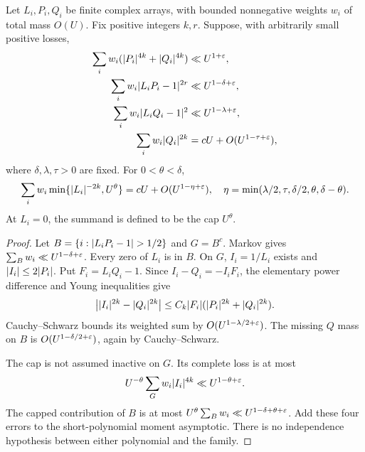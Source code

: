 \begin{theorem}\label{thm:two-mollifier}
Let $L_i,P_i,Q_i$ be finite complex arrays, with bounded nonnegative weights $w_i$ of total mass $O(U)$. Fix positive integers $k,r$. Suppose, with arbitrarily small positive losses,
\begin{align*}
 \sum_iw_i(\lvert P_i\rvert^{4k}+\lvert Q_i\rvert^{4k})&\ll U^{1+\varepsilon},\\
 \sum_iw_i\lvert L_iP_i-1\rvert^{2r}&\ll U^{1-\delta+\varepsilon},\\
 \sum_iw_i\lvert L_iQ_i-1\rvert^{2}&\ll U^{1-\lambda+\varepsilon},\\
 \sum_iw_i\lvert Q_i\rvert^{2k}&=cU+O(U^{1-\tau+\varepsilon}),
\end{align*}
where $\delta,\lambda,\tau>0$ are fixed. For $0<\theta<\delta$,
\begin{equation}\label{eq:two-mollifier}
 \sum_iw_i\min\{\lvert L_i\rvert^{-2k},U^\theta\}
 =cU+O(U^{1-\eta+\varepsilon}),\quad
 \eta=\min(\lambda/2,\tau,\delta/2,\theta,\delta-\theta).
\end{equation}
At $L_i=0$, the summand is defined to be the cap $U^\theta$.
\end{theorem}
\begin{proof}
Let $B=\{i:\lvert L_iP_i-1\rvert>1/2\}$ and $G=B^c$. Markov gives $\sum_Bw_i\ll U^{1-\delta+\varepsilon}$. Every zero of $L_i$ is in $B$. On $G$, $I_i=1/L_i$ exists and $\lvert I_i\rvert\le2\lvert P_i\rvert$. Put $F_i=L_iQ_i-1$. Since $I_i-Q_i=-I_iF_i$, the elementary power difference and Young inequalities give
\[
 \bigl|\lvert I_i\rvert^{2k}-\lvert Q_i\rvert^{2k}\bigr|
 \le C_k\lvert F_i\rvert(\lvert P_i\rvert^{2k}+\lvert Q_i\rvert^{2k}).
\]
Cauchy--Schwarz bounds its weighted sum by $O(U^{1-\lambda/2+\varepsilon})$. The missing $Q$ mass on $B$ is $O(U^{1-\delta/2+\varepsilon})$, again by Cauchy--Schwarz.

The cap is not assumed inactive on $G$. Its complete loss is at most
\[
 U^{-\theta}\sum_Gw_i\lvert I_i\rvert^{4k}\ll U^{1-\theta+\varepsilon}.
\]
The capped contribution of $B$ is at most $U^\theta\sum_Bw_i\ll U^{1-\delta+\theta+\varepsilon}$. Add these four errors to the short-polynomial moment asymptotic. There is no independence hypothesis between either polynomial and the family.
\end{proof}

